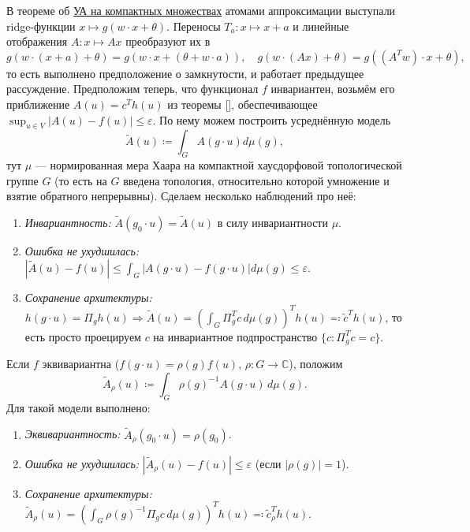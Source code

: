 \documentclass[../NDCNNAI_main.tex]{subfiles}
\begin{document}
В теореме об \hyperref[thm:uat_compact]{УА на компактных множествах} атомами аппроксимации выступали ridge-функции $x \mapsto g(w \cdot x + \theta)$.
Переносы $T_a\colon x \mapsto x + a$ и линейные отображения $A\colon x \mapsto Ax$ преобразуют их в
$$g(w \cdot (x + a) + \theta) = g(w \cdot x + (\theta + w \cdot a)), \quad g(w \cdot (Ax) + \theta) = g((A^T w) \cdot x + \theta),$$
то есть выполнено предположение о замкнутости, и работает предыдущее рассуждение.
Предположим теперь, что функционал $f$ инвариантен, возьмём его приближение $A(u) = c^T h(u)$ из теоремы [], обеспечивающее $\sup_{u \in V} |A(u) - f(u)| \le \varepsilon$.
По нему можем построить усреднённую модель
$$\widetilde{A}(u) \coloneq \int_G A(g \cdot u) d\mu(g),$$
тут $\mu$ --- нормированная мера Хаара на компактной хаусдорфовой топологической группе $G$ (то есть на $G$ введена топология, относительно которой умножение и взятие обратного непрерывны).
Сделаем несколько наблюдений про неё:
\begin{enumerate}
  \item \emph{Инвариантность:} $\widetilde{A}(g_0 \cdot u) = \widetilde{A}(u)$ в силу инвариантности $\mu$.
  \item \emph{Ошибка не ухудшилась:} $|\widetilde{A}(u) - f(u)| \le \int_G |A(g \cdot u) - f(g \cdot u)| d\mu(g) \le \varepsilon$.
  \item \emph{Сохранение архитектуры:} $h(g \cdot u) = \Pi_g h(u) \Rightarrow \widetilde{A}(u) = \left(\int_G \Pi_g^T c\,d\mu(g)\right)^T h(u) \eqcolon \tilde{c}^T h(u)$, то есть просто проецируем $c$ на инвариантное подпространство $\{c\colon \Pi_g^T c = c\}$.
\end{enumerate}
Если $f$ эквивариантна ($f(g \cdot u) = \rho(g)f(u)$, $\rho\colon G \to \mathbb{C}$), положим
$$\tilde{A}_\rho(u) \coloneq \int_{G} \rho(g)^{-1} A(g \cdot u) \, d\mu(g).$$
Для такой модели выполнено:
\begin{enumerate}
  \item \emph{Эквивариантность:} $\tilde{A}_\rho(g_0 \cdot u) = \rho(g_0)$.
  \item \emph{Ошибка не ухудшилась:} $|\widetilde{A}_\rho(u) - f(u)| \le \varepsilon$ (если $|\rho(g)| = 1$).
  \item \emph{Сохранение архитектуры:} $\tilde{A}_{\rho}(u) = (\int_{G} \rho(g)^{-1} \Pi_g c \, d\mu(g))^T h(u) \eqcolon \tilde{c}_\rho^T h(u)$.
\end{enumerate}
\end{document}
